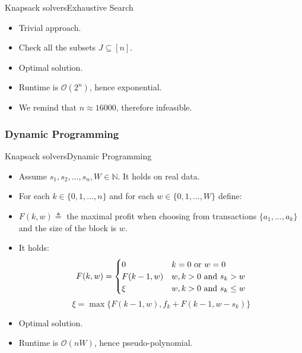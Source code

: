 \documentclass{beamer}
\begin{document}
\begin{frame}{Knapsack solvers}{Exhaustive Search}
    \begin{itemize}
        \item {Trivial approach.}
        \item {Check all the subsets $J \subseteq [n]$.}
        \item{Optimal solution.}
        \item {Runtime is $ \mathcal{O}(2^n)$, hence exponential.}
        \item {We remind that $n \approx 16000$, therefore infeasible.}
    \end{itemize}
\end{frame}
\subsubsection*{Dynamic Programming}

\begin{frame}{Knapsack solvers}{Dynamic Programming}
    \begin{itemize}
        \item {Assume $s_1,s_2,...,s_n,W \in \mathbb N$. It holds on real 
        data.}
        \item {For each $ k\in \{0,1,...,n\}$ and for each 
        $w\in \{0,1,...,W\} $ define:}
          \item {$F(k,w) \triangleq$  the maximal profit when 
        choosing from transactions $\{a_1,...,a_k\}$ and the size of the 
        block is $w$.}
        \item { It holds:
            \begin{equation*}
                F(k,w) = \begin{cases}
                0 & \text{$k = 0$ or $ w = 0$}\\
                F(k-1,w) & \text{$w,k > 0$ and $s_k > w$} \\
                \xi & \text{$w,k > 0$ and $s_k \leq w$}
                \end{cases}
            \end{equation*}
            $$ \xi = \max\{F(k-1,w), f_k + F(k-1,w-s_k)\} $$
            }
        \item {Optimal solution.}
        \item {Runtime is $\mathcal{O}(nW)$, hence pseudo-polynomial.}
    \end{itemize}
\end{frame}
\end{document}

